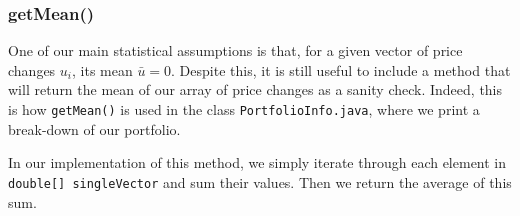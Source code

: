 \documentclass[../Dissertation.tex]{subfiles}
\begin{document}
\subsubsection{getMean()}

One of our main statistical assumptions is that, for a given vector of price changes $u_i$, its mean $\bar{u} = 0$.
Despite this, it is still useful to include a method that will return the mean of our array of price changes as a sanity check.
Indeed, this is how \lstinline|getMean()| is used in the class \lstinline|PortfolioInfo.java|, where we print a break-down of our portfolio.

In our implementation of this method, we simply iterate through each element in \lstinline|double[] singleVector| and sum their values.
Then we return the average of this sum.
\end{document}
